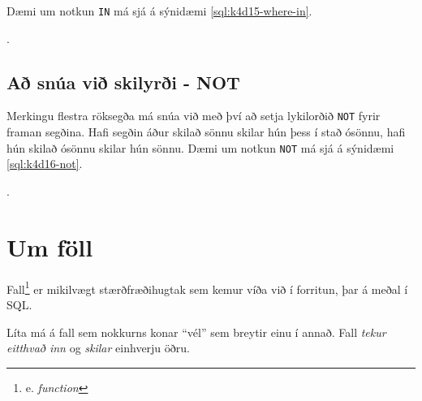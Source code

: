Dæmi um notkun \verb|IN| má sjá á sýnidæmi \ref{sql:k4d15-where-in}.

\begin{example}
\caption[WHERE með IN]{Tvær \emph{SELECT} skipanir sem gera sama hlutinn. Þær finna báðar nemendurna með númerin 1, 3, 5 og 7. Seinni skipunin er þó töluvert skárri!}
\label{sql:k4d15-where-in}.
\centering
{}
\end{example}
\subsection{Að snúa við skilyrði - NOT}
Merkingu flestra röksegða má snúa við með því að setja lykilorðið \verb|NOT| fyrir framan segðina. Hafi segðin áður skilað sönnu skilar hún þess í stað ósönnu, hafi hún skilað ósönnu skilar hún sönnu. Dæmi um notkun \verb|NOT| má sjá á sýnidæmi \ref{sql:k4d16-not}.

\begin{example}
\caption[NOT lykilorðið]{\emph{SELECT} skipun sem finnur alla nemendur sem \emph{ekki} byrja á stafnum \emph{``K''}.}
\label{sql:k4d16-not}.
\centering
{}
\end{example}
\section{Um föll}
\label{undirkafli:foll}
Fall\footnote{e. \emph{function}} er mikilvægt stærðfræðihugtak sem kemur víða við í forritun, þar á meðal í SQL.

Líta má á fall sem nokkurns konar ``vél'' sem breytir einu í annað. Fall \emph{tekur eitthvað inn} og \emph{skilar} einhverju öðru.

